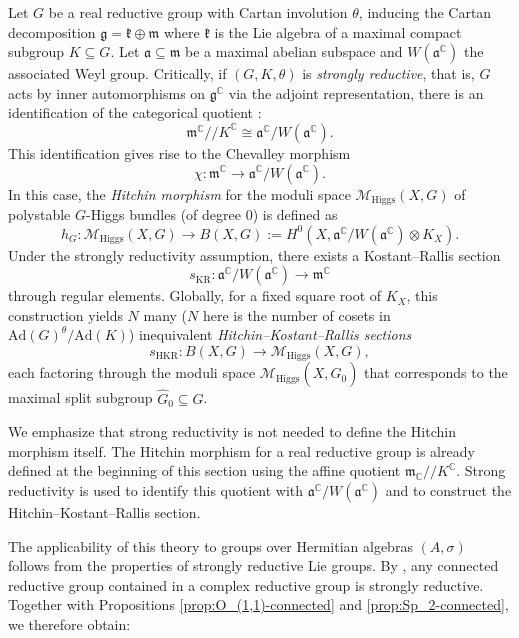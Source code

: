 \documentclass[oneside,11pt]{amsart}
\theoremstyle{definition}
\theoremstyle{remark}
\numberwithin{thm}{section}
\numberwithin{equation}{section}
\begin{document}
Let $G$ be a real reductive group with Cartan involution $\theta$, inducing the Cartan decomposition $\mathfrak{g} = \mathfrak{k} \oplus \mathfrak{m}$ where $\mathfrak{k}$ is the Lie algebra of a maximal compact subgroup $K \subseteq G$. Let $\mathfrak{a} \subseteq \mathfrak{m}$ be a maximal abelian subspace and $W(\mathfrak{a}^\mathbb{C})$ the associated Weyl group. Critically, if $(G, K, \theta)$ is \emph{strongly reductive}, that is, $G$ acts by inner automorphisms on $\mathfrak{g}^{\mathbb{C}}$ via the adjoint representation, there is an identification of the categorical quotient \cite[Section 4]{GPR}:
$$
\mathfrak{m}^{\mathbb{C}} /\!\!/ K^{\mathbb{C}} \cong \mathfrak{a}^{\mathbb{C}} / W(\mathfrak{a}^{\mathbb{C}}).
$$
This identification gives rise to the Chevalley morphism
$$
\chi \colon \mathfrak{m}^{\mathbb{C}}\longrightarrow\mathfrak{a}^{\mathbb{C}}/W(\mathfrak{a}^{\mathbb{C}}).
$$
In this case, the \emph{Hitchin morphism} for the moduli space $\mathcal{M}_{\mathrm{Higgs}}(X,G)$ of polystable $G$-Higgs bundles (of degree 0) is defined as
$$
h_G \colon \mathcal{M}_{\mathrm{Higgs}}(X,G) \longrightarrow B(X,G) := H^0(X, \mathfrak{a}^{\mathbb{C}}/W(\mathfrak{a}^{\mathbb{C}}) \otimes K_X).
$$
Under the strongly reductivity assumption, there exists a Kostant--Rallis section \[s_{\mathrm{KR}} \colon \mathfrak{a}^{\mathbb{C}}/W(\mathfrak{a}^{\mathbb{C}}) \to \mathfrak{m}^{\mathbb{C}}\] through regular elements. Globally, for a fixed square root of $K_X$, this construction yields $N$ many ($N$ here is the number of cosets in $\mathrm{Ad}(G)^\theta / \mathrm{Ad}(K)$) inequivalent \emph{Hitchin--Kostant--Rallis sections} 
$$
s_{\mathrm{HKR}} \colon B(X,G) \longrightarrow \mathcal{M}_{\mathrm{Higgs}}(X,G),
$$ 
each factoring through the moduli space $\mathcal{M}_{\mathrm{Higgs}}(X,\widehat{G}_0)$ that corresponds to the maximal split subgroup $\widehat{G}_0 \subseteq G$.

We emphasize that strong reductivity is not needed to define the Hitchin morphism itself. The Hitchin morphism for a real reductive group is already defined at the beginning of this section using the affine quotient $\mathfrak m_{\mathbb C}/\!\!/K^{\mathbb C}$. Strong reductivity is used to identify this quotient with $\mathfrak a^{\mathbb C}/W(\mathfrak a^{\mathbb C})$ and to construct the Hitchin--Kostant--Rallis section.


The applicability of this theory to groups over Hermitian algebras $(A, \sigma)$ follows from the properties of strongly reductive Lie groups. By \cite[Prop.~1.2.8]{Peon}, any connected reductive group contained in a complex reductive group is strongly reductive. Together with Propositions \ref{prop:O_(1,1)-connected} and \ref{prop:Sp_2-connected}, we therefore obtain:
\end{document}
